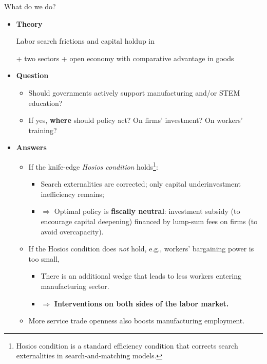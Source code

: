 \documentclass[9pt,xcolor={svgnames}]{beamer}
\begin{document}
\begin{frame}{What do we do?}
\begin{itemize}

  \item \textbf{Theory}

  Labor search frictions and capital holdup in \textcolor{blue}{\cite{acemoglu1999holdups}}

+ two sectors + open economy with comparative advantage in goods 

\vspace{2mm}

  \item \textbf{Question}
  \begin{itemize}
      \item Should governments actively support manufacturing and/or STEM education?
      \item If yes, \textbf{where} should policy act? On firms’ investment? On workers’ training?
  \end{itemize}
  \vspace{2mm}
  \item \textbf{Answers}
    \begin{itemize}
      \item If the knife-edge \textit{Hosios condition} holds\footnote{Hosios condition is a standard efficiency condition that corrects search externalities in search-and-matching models.}:
      \begin{itemize}
          \item Search externalities are corrected; only capital underinvestment inefficiency remains;
          \item $\Rightarrow$ Optimal policy is \textbf{fiscally neutral}: investment subsidy (to encourage capital deepening) financed by lump-sum fees on firms (to avoid overcapacity).
      \end{itemize}

\vspace{2mm}
      
      \item If the Hosios condition does \textit{not} hold, e.g., workers' bargaining power is too small,
        \begin{itemize}
          \item There is an additional wedge that leads to less workers entering manufacturing sector. 
          \item $\Rightarrow$ \textbf{Interventions on  both sides of the labor market.}
       
      \end{itemize}

      \vspace{2mm}

          \item More service trade openness also boosts manufacturing employment. 
    \end{itemize}
\end{itemize}
\end{frame}
\end{document}

